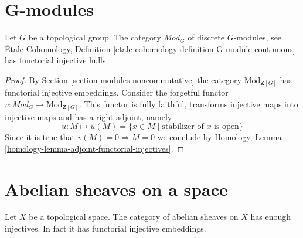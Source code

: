 \section{G-modules}
\label{section-G-modules}

\begin{lemma}
\label{lemma-G-modules}
Let $G$ be a topological group.
The category $\textit{Mod}_G$ of discrete $G$-modules, see
\'Etale Cohomology, Definition
\ref{etale-cohomology-definition-G-module-continuous}
has functorial injective hulls.
\end{lemma}

\begin{proof}
By
Section \ref{section-modules-noncommutative}
the category $\text{Mod}_{\mathbf{Z}[G]}$ has functorial
injective embeddings.
Consider the forgetful functor
$v : \textit{Mod}_G \to \text{Mod}_{\mathbf{Z}[G]}$.
This functor is fully faithful, transforms injective maps into
injective maps and has a right adjoint, namely
$$
u : M \mapsto u(M) = \{x \in M \mid \text{stabilizer of }x\text{ is open}\}
$$
Since it is true that $v(M) = 0 \Rightarrow M = 0$ we conclude by
Homology, Lemma \ref{homology-lemma-adjoint-functorial-injectives}.
\end{proof}



\section{Abelian sheaves on a space}
\label{section-abelian-sheaves-space}


\begin{lemma}
\label{lemma-abelian-sheaves-space}
Let $X$ be a topological space.
The category of abelian sheaves on $X$ has enough injectives.
In fact it has functorial injective embeddings.
\end{lemma}

